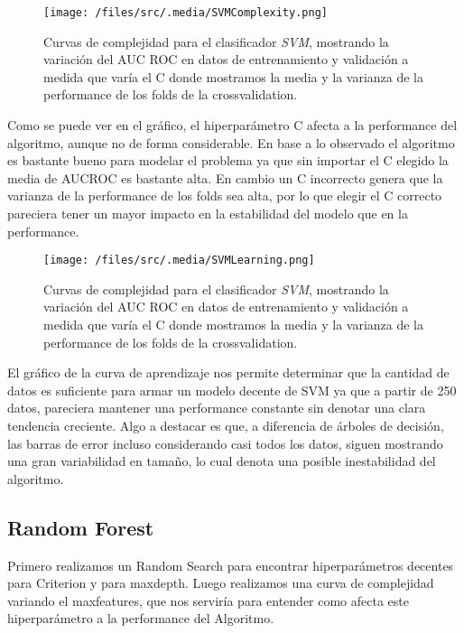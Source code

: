 \begin{figure}[!htbp] 
    \centering
    \texttt{[image: /files/src/.media/SVMComplexity.png]}
    \caption{Curvas de complejidad para el clasificador \textit{SVM}, mostrando la variación del AUC ROC en datos de entrenamiento y validación a medida que varía el C donde mostramos la media y la varianza de la performance de los folds de la crossvalidation.}
    \label{SVMComplexity}
\end{figure}

Como se puede ver en el gráfico, el hiperparámetro C afecta a la performance del algoritmo, aunque no de forma considerable. En base a lo observado el algoritmo es bastante bueno para modelar el problema ya que sin importar el C elegido la media de AUCROC es bastante alta. En cambio un C incorrecto genera que la varianza de la performance de los folds sea alta, por lo que elegir el C correcto pareciera tener un mayor impacto en la estabilidad del modelo que en la performance.

\begin{figure}[!htbp]
    \centering
    \texttt{[image: /files/src/.media/SVMLearning.png]}
    \caption{Curvas de complejidad para el clasificador \textit{SVM}, mostrando la variación del AUC ROC en datos de entrenamiento y validación a medida que varía el C donde mostramos la media y la varianza de la performance de los folds de la crossvalidation.}
    \label{SVMLearning}
\end{figure}

El gráfico de la curva de aprendizaje nos permite determinar que la cantidad de datos es suficiente para armar un modelo decente de SVM ya que a partir de 250 datos, pareciera mantener una performance constante sin denotar una clara tendencia creciente. Algo a destacar es que, a diferencia de árboles de decisión, las barras de error incluso considerando casi todos los datos, siguen mostrando una gran variabilidad en tamaño, lo cual denota una posible inestabilidad del algoritmo.

\subsection{Random Forest}

Primero realizamos un Random Search para encontrar hiperparámetros decentes para Criterion y para maxdepth. Luego realizamos una curva de complejidad variando el maxfeatures, que nos serviría para entender como afecta este hiperparámetro a la performance del Algoritmo. 

